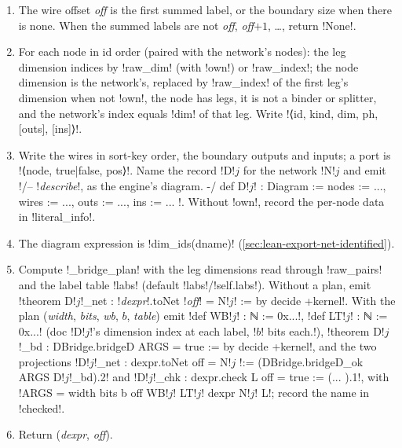 {\begin{algorithm}[\py!diagram_literal(d, net, name, own=False, labs=None)!]\label{alg:lean-export-net-literal}
\begin{enumerate}
\item The wire offset \textit{off} is the first summed label, or the boundary size when there is
  none. When the summed labels are not \textit{off}, \textit{off}$+1$, \dots, return \py!None!.
\item For each node in id order (paired with the network's nodes): the leg dimension indices by
  \py!raw_dim! (with \py!own!) or \py!raw_index!; the node dimension is the network's, replaced by
  \py!raw_index! of the first leg's dimension when not \py!own!, the node has legs, it is not a
  binder or splitter, and the network's index equals \py!dim! of that leg. Write
  \code!⟨id, kind, dim, ph, [outs], [ins]⟩!.
\item Write the wires in sort-key order, the boundary outputs and inputs; a port is
  \code!⟨node, true|false, pos⟩!. Name the record \code!D!$j$ for the network \code!N!$j$ and emit
  \code!/-- !\textit{describe}\code!, as the engine's diagram. -/ def D!$j$\code! : Diagram := { nodes := ..., wires := ..., outs := ..., ins := ... }!.
  Without \py!own!, record the per-node data in \py!literal_info!.
\item The diagram expression is \py!dim_ids(dname)! (\cref{sec:lean-export-net-identified}).
\item Compute \py!_bridge_plan! with the leg dimensions read through \py!raw_pairs! and the
  label table \py!labs! (default \code!labs!/\py!self.labs!). Without a plan, emit
  \code!theorem D!$j$\code!_net : !\textit{dexpr}\code!.toNet !\textit{off}\code! = N!$j$\code! := by decide +kernel!.
  With the plan (\textit{width}, \textit{bits}, \textit{wb}, $b$, \textit{table}) emit
  \code!def WB!$j$\code! : ℕ := 0x...!, \code!def LT!$j$\code! : ℕ := 0x...! (doc
  \code!D!$j$\code!'s dimension index at each label, !$b$\code! bits each.!),
  \code!theorem D!$j$\code!_bd : DBridge.bridgeD ARGS = true := by decide +kernel!, and the two
  projections \code!D!$j$\code!_net : dexpr.toNet off = N!$j$ \code!:= (DBridge.bridgeD_ok ARGS D!$j$\code!_bd).2!
  and \code!D!$j$\code!_chk : dexpr.check L off = true := (... ).1!, with
  \code!ARGS = width bits b off WB!$j$\code! LT!$j$\code! dexpr N!$j$\code! L!; record the name in
  \py!checked!.
\item Return (\textit{dexpr}, \textit{off}).
\end{enumerate}
\end{algorithm}

}

